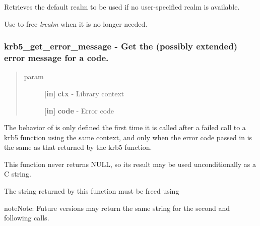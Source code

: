 \documentclass[letterpaper,10pt,english]{sphinxmanual}
\begin{document}
Retrieves the default realm to be used if no user-specified realm is available.

Use {\hyperref[appdev/refs/api/krb5_free_default_realm:krb5_free_default_realm]{}} to free \emph{lrealm} when it is no longer needed.


\subsubsection{krb5\_get\_error\_message -  Get the (possibly extended) error message for a code.}
\label{appdev/refs/api/krb5_get_error_message::doc}\label{appdev/refs/api/krb5_get_error_message:krb5-get-error-message-get-the-possibly-extended-error-message-for-a-code}

\begin{fulllineitems}
\label{appdev/refs/api/krb5_get_error_message:krb5_get_error_message}
\end{fulllineitems}

\begin{quote}\begin{description}
\item[{param}] \leavevmode
\textbf{{[}in{]}} \textbf{ctx} - Library context

\textbf{{[}in{]}} \textbf{code} - Error code

\end{description}\end{quote}

The behavior of {\hyperref[appdev/refs/api/krb5_get_error_message:krb5_get_error_message]{}} is only defined the first time it is called after a failed call to a krb5 function using the same context, and only when the error code passed in is the same as that returned by the krb5 function.

This function never returns NULL, so its result may be used unconditionally as a C string.

The string returned by this function must be freed using {\hyperref[appdev/refs/api/krb5_free_error_message:krb5_free_error_message]{}}

\begin{notice}{note}{Note:}
Future versions may return the same string for the second and following calls.
\end{notice}
\end{document}
